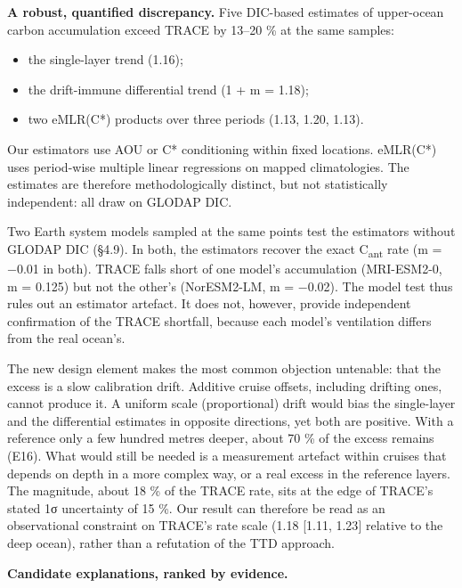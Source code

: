 \documentclass[11pt]{article}
\providecommand{\tightlist}{\setlength{\itemsep}{0pt}\setlength{\parskip}{0pt}}
\begin{document}
\textbf{A robust, quantified discrepancy.} Five DIC-based estimates of
upper-ocean carbon accumulation exceed TRACE by 13--20 \% at the same
samples:

\begin{itemize}
\tightlist
\item
  the single-layer trend (1.16);
\item
  the drift-immune differential trend (1 + m = 1.18);
\item
  two eMLR(C*) products over three periods (1.13, 1.20, 1.13).
\end{itemize}

Our estimators use AOU or C* conditioning within fixed locations.
eMLR(C*) uses period-wise multiple linear regressions on mapped
climatologies. The estimates are therefore methodologically distinct,
but not statistically independent: all draw on GLODAP DIC.

Two Earth system models sampled at the same points test the estimators
without GLODAP DIC (§4.9). In both, the estimators recover the exact
C\textsubscript{ant} rate (m = −0.01 in both). TRACE falls short of one
model's accumulation (MRI-ESM2-0, m = 0.125) but not the other's
(NorESM2-LM, m = −0.02). The model test thus rules out an estimator
artefact. It does not, however, provide independent confirmation of the
TRACE shortfall, because each model's ventilation differs from the real
ocean's.

The new design element makes the most common objection untenable: that
the excess is a slow calibration drift. Additive cruise offsets,
including drifting ones, cannot produce it. A uniform scale
(proportional) drift would bias the single-layer and the differential
estimates in opposite directions, yet both are positive. With a
reference only a few hundred metres deeper, about 70 \% of the excess
remains (E16). What would still be needed is a measurement artefact
within cruises that depends on depth in a more complex way, or a real
excess in the reference layers. The magnitude, about 18 \% of the TRACE
rate, sits at the edge of TRACE's stated 1σ uncertainty of 15 \%. Our
result can therefore be read as an observational constraint on TRACE's
rate scale (1.18 {[}1.11, 1.23{]} relative to the deep ocean), rather
than a refutation of the TTD approach.

\textbf{Candidate explanations, ranked by evidence.}
\end{document}
